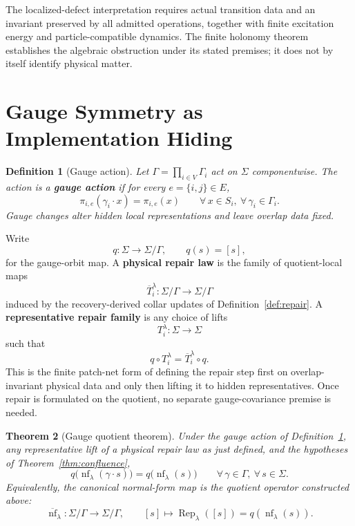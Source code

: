 \documentclass[11pt]{article}
\newtheorem{theorem}{Theorem}[section]
\newtheorem{definition}[theorem]{Definition}
\theoremstyle{remark}
\theoremstyle{plain}
\begin{document}
The localized-defect interpretation requires actual transition data and an
invariant preserved by all admitted operations, together with finite
excitation energy and particle-compatible dynamics. The finite holonomy
theorem establishes the algebraic obstruction under its stated premises;
it does not by itself identify physical matter.


\section{Gauge Symmetry as Implementation Hiding}

\begin{definition}[Gauge action]\label{def:gauge}
Let $\Gamma = \prod_{i\in V}\Gamma_i$ act on $\Sigma$ componentwise. The action is a \textbf{gauge action} if for every $e=\{i,j\}\in E$,
\[
\pi_{i,e}(\gamma_i\cdot x)=\pi_{i,e}(x)
\qquad
\forall\, x\in S_i,\ \forall\, \gamma_i\in \Gamma_i.
\]
Gauge changes alter hidden local representations and leave overlap data fixed.
\end{definition}

Write
\[
q:\Sigma\to \Sigma/\Gamma,
\qquad
q(s)=[s],
\]
for the gauge-orbit map. A \textbf{physical repair law} is the family of quotient-local maps
\[
\overline T_i^\lambda:\Sigma/\Gamma\to \Sigma/\Gamma
\]
induced by the recovery-derived collar updates of Definition~\ref{def:repair}. A
\textbf{representative repair family} is any choice of lifts
\[
T_i^\lambda:\Sigma\to\Sigma
\]
such that
\[
q\circ T_i^\lambda
=
\overline T_i^\lambda\circ q.
\]
This is the finite patch-net form of defining the repair step first on overlap-invariant
physical data and only then lifting it to hidden representatives. Once repair is formulated on
the quotient, no separate gauge-covariance premise is needed.

\begin{theorem}[Gauge quotient theorem]\label{thm:gauge}
Under the gauge action of Definition~\ref{def:gauge}, any representative lift of a physical repair
law as just defined, and the hypotheses of Theorem~\ref{thm:confluence},
\[
q\bigl(\operatorname{nf}_\lambda(\gamma\cdot s)\bigr)
=
q\bigl(\operatorname{nf}_\lambda(s)\bigr)
\qquad
\forall\, \gamma\in\Gamma,\ \forall\, s\in\Sigma.
\]
Equivalently, the canonical normal-form map is the quotient operator
constructed above:
\[
\overline{\operatorname{nf}}_\lambda:\Sigma/\Gamma \to \Sigma/\Gamma,
\qquad
[s]\mapsto \operatorname{Rep}_\lambda([s])
=q(\operatorname{nf}_\lambda(s)).
\]
\end{theorem}
\end{document}
